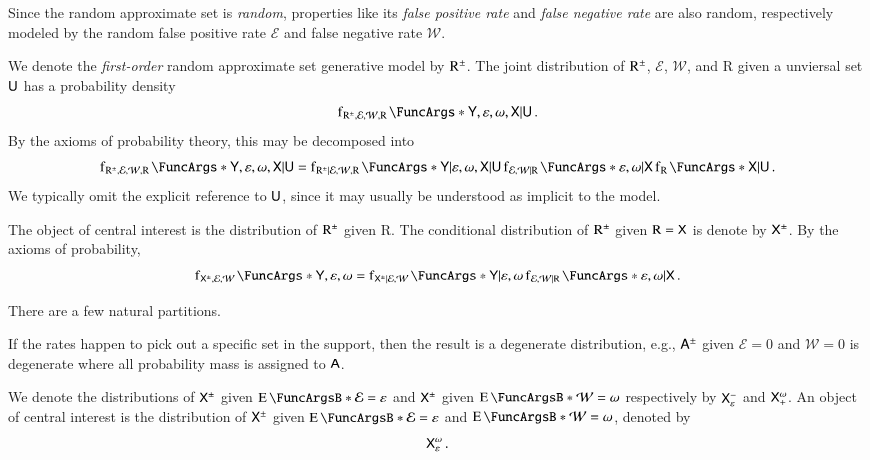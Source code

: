 \documentclass[10pt,final,hidelinks]{article}
\numberwithin{equation}{section}
\providecommand{\Given}{\vert}
\newcommand{\FNR}{\mathcal{W}}
\newcommand{\FPR}{\mathcal{E}}
\newcommand{\fprate}{\varepsilon}
\newcommand{\fnrate}{\omega}
\newcommand{\RV}[1]{\mathrm{#1}}
\theoremstyle{plain}
\begin{document}
Since the random approximate set is \emph{random}, properties like its \emph{false positive rate} and \emph{false negative rate} are also random, respectively modeled by the random false positive rate $\FPR$ and false negative rate $\FNR$.

We denote the \emph{first-order} random approximate set generative model by $\AT{\RV{R}}$.
The joint distribution of $\AT{\RV{R}}$, $\FPR$, $\FNR$, and $\RV{R}$ given a unviersal set $\Set{U}$ has a probability density
\begin{equation}
\PDF{\Set{Y}, \fprate, \fnrate, \Set{X} \Given \Set{U}}[\AT{\RV{R}}, \FPR, \FNR, \RV{R}]\,.
\end{equation}
By the axioms of probability theory, this may be decomposed into
\begin{equation}
\PDF{\Set{Y},\fprate, \fnrate, \Set{X} \Given \Set{U}}[\AT{\RV{R}}, \FPR, \FNR, \RV{R}] =
\PDF{\Set{Y} \Given \fprate, \fnrate, \Set{X} \Given \Set{U}}[\AT{\RV{R}} \Given \FPR, \FNR, \RV{R}]
\PDF{\fprate, \fnrate \Given \Set{X}}[\FPR, \FNR \Given \RV{R}]
\PDF{\Set{X} \Given \Set{U}}[\RV{R}]\,.
\end{equation}
We typically omit the explicit reference to $\Set{U}$, since it may usually be understood as implicit to the model.

The object of central interest is the distribution of $\AT{\RV{R}}$ given $\RV{R}$.
The conditional distribution of $\AT{\RV{R}}$ given $\RV{R} = \Set{X}$ is denote by $\ASet{X}$.
By the axioms of probability,
\begin{equation}
\PDF{\Set{Y},\fprate, \fnrate}[\ASet{X}, \FPR, \FNR] =
\PDF{\Set{Y} \Given \fprate, \fnrate}[\ASet{X} \Given \FPR, \FNR]
\PDF{\fprate, \fnrate \Given \Set{X}}[\FPR, \FNR \Given \RV{R}]\,.
\end{equation}



There are a few natural partitions.







If the rates happen to pick out a specific set in the support, then the result is a degenerate distribution, e.g., $\ASet{A}$ given $\FPR = 0$ and $\FNR = 0$ is degenerate where all probability mass is assigned to $\Set{A}$.

We denote the distributions of $\ASet{X}$ given $\Expect{\FPR} = \fprate$ and $\ASet{X}$ given $\Expect{\FNR} = \fnrate$ respectively by $\ASet{X}[\fprate][-]$ and $\ASet{X}[+][\fnrate]$.
An object of central interest is the distribution of $\ASet{X}$ given $\Expect{\FPR} = \fprate$ and $\Expect{\FNR} = \fnrate$, denoted by
\begin{equation}
\ASet{X}[\fprate][\fnrate]\,.
\end{equation}
\end{document}

